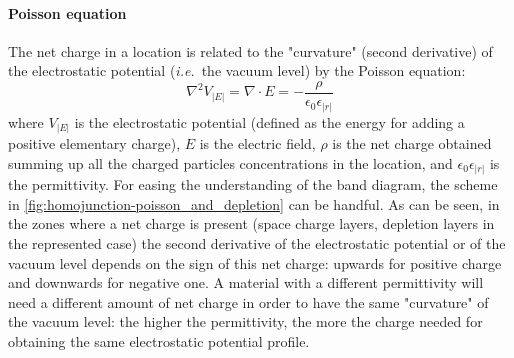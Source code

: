 		\paragraph{Poisson equation}
		The net charge in a location is related to the "curvature" (second derivative) of the electrostatic potential (\textsl{i.e.}\ the vacuum level) by the Poisson equation:
		\begin{equation}
			\nabla^2 V_|E| = \nabla \cdot E = -\frac{\rho}{\epsilon_0 \epsilon_|r|}
		\end{equation}
		where $V_|E|$ is the electrostatic potential (defined as the energy for adding a positive elementary charge), $E$ is the electric field, $\rho$ is the net charge obtained summing up all the charged particles concentrations in the location, and $\epsilon_0 \epsilon_|r|$ is the permittivity.
		For easing the understanding of the band diagram, the scheme in \cref{fig:homojunction-poisson_and_depletion} can be handful.
		As can be seen, in the zones where a net charge is present (space charge layers, depletion layers in the represented case) the second derivative of the electrostatic potential or of the vacuum level depends on the sign of this net charge: upwards for positive charge and downwards for negative one.
		A material with a different permittivity will need a different amount of net charge in order to have the same "curvature" of the vacuum level: the higher the permittivity, the more the charge needed for obtaining the same electrostatic potential profile.

